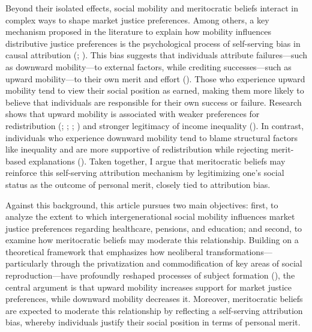 \documentclass[
  13pt,
]{article}
\begin{document}
Beyond their isolated effects, social mobility and meritocratic beliefs
interact in complex ways to shape market justice preferences. Among
others, a key mechanism proposed in the literature to explain how
mobility influences distributive justice preferences is the
psychological process of self-serving bias in causal attribution
(;
). This bias
suggests that individuals attribute failures---such as downward
mobility---to external factors, while crediting successes---such as
upward mobility---to their own merit and effort
(). Those
who experience upward mobility tend to view their social position as
earned, making them more likely to believe that individuals are
responsible for their own success or failure. Research shows that upward
mobility is associated with weaker preferences for redistribution
(;
;
; ) and stronger legitimacy of income inequality
(). In contrast,
individuals who experience downward mobility tend to blame structural
factors like inequality and are more supportive of redistribution while
rejecting merit-based explanations
(). Taken
together, I argue that meritocratic beliefs may reinforce this
self-serving attribution mechanism by legitimizing one's social status
as the outcome of personal merit, closely tied to attribution bias.

Against this background, this article pursues two main objectives:
first, to analyze the extent to which intergenerational social mobility
influences market justice preferences regarding healthcare, pensions,
and education; and second, to examine how meritocratic beliefs may
moderate this relationship. Building on a theoretical framework that
emphasizes how neoliberal transformations---particularly through the
privatization and commodification of key areas of social
reproduction---have profoundly reshaped processes of subject formation
(), the central argument is
that upward mobility increases support for market justice preferences,
while downward mobility decreases it. Moreover, meritocratic beliefs are
expected to moderate this relationship by reflecting a self-serving
attribution bias, whereby individuals justify their social position in
terms of personal merit.
\end{document}
